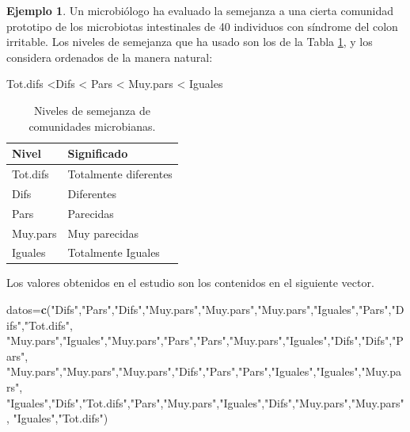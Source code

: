 \documentclass[
]{book}
\newenvironment{Shaded}{\begin{snugshade}}{\end{snugshade}}
\newcommand{\KeywordTok}[1]{\textcolor[rgb]{0.13,0.29,0.53}{\textbf{#1}}}
\newcommand{\NormalTok}[1]{#1}
\newcommand{\StringTok}[1]{\textcolor[rgb]{0.31,0.60,0.02}{#1}}
\theoremstyle{definition}
\theoremstyle{definition}
\newtheorem{example}{Ejemplo}[chapter]
\theoremstyle{definition}
\theoremstyle{remark}
\begin{document}
\begin{example}
\protect\hypertarget{exm:ex1706}{}{\label{exm:ex1706} }Un microbiólogo ha evaluado la semejanza a una cierta comunidad prototipo de los microbiotas intestinales de 40 individuos con síndrome del colon irritable. Los niveles de semejanza que ha usado son los de la Tabla \ref{tab:tablameta}, y los considera ordenados de la manera natural:
\end{example}

Tot.difs \textless Difs \textless{} Pars \textless{} Muy.pars \textless{} Iguales

\begin{table}

\caption{\label{tab:tablameta}Niveles de semejanza de comunidades microbianas.}
\centering
\begin{tabular}[t]{ll}
\toprule
Nivel & Significado\\
\midrule
Tot.difs & Totalmente diferentes\\
Difs & Diferentes\\
Pars & Parecidas\\
Muy.pars & Muy parecidas\\
Iguales & Totalmente Iguales\\
\bottomrule
\end{tabular}
\end{table}

Los valores obtenidos en el estudio son los contenidos en el siguiente vector.

\begin{Shaded}
\begin{Highlighting}[]
\NormalTok{datos=}\KeywordTok{c}\NormalTok{(}\StringTok{"Difs"}\NormalTok{,}\StringTok{"Pars"}\NormalTok{,}\StringTok{"Difs"}\NormalTok{,}\StringTok{"Muy.pars"}\NormalTok{,}\StringTok{"Muy.pars"}\NormalTok{,}\StringTok{"Muy.pars"}\NormalTok{,}\StringTok{"Iguales"}\NormalTok{,}\StringTok{"Pars"}\NormalTok{,}\StringTok{"Difs"}\NormalTok{,}\StringTok{"Tot.difs"}\NormalTok{,}
        \StringTok{"Muy.pars"}\NormalTok{,}\StringTok{"Iguales"}\NormalTok{,}\StringTok{"Muy.pars"}\NormalTok{,}\StringTok{"Pars"}\NormalTok{,}\StringTok{"Pars"}\NormalTok{,}\StringTok{"Muy.pars"}\NormalTok{,}\StringTok{"Iguales"}\NormalTok{,}\StringTok{"Difs"}\NormalTok{,}\StringTok{"Difs"}\NormalTok{,}\StringTok{"Pars"}\NormalTok{,}
        \StringTok{"Muy.pars"}\NormalTok{,}\StringTok{"Muy.pars"}\NormalTok{,}\StringTok{"Muy.pars"}\NormalTok{,}\StringTok{"Difs"}\NormalTok{,}\StringTok{"Pars"}\NormalTok{,}\StringTok{"Pars"}\NormalTok{,}\StringTok{"Iguales"}\NormalTok{,}\StringTok{"Iguales"}\NormalTok{,}\StringTok{"Muy.pars"}\NormalTok{,}
        \StringTok{"Iguales"}\NormalTok{,}\StringTok{"Difs"}\NormalTok{,}\StringTok{"Tot.difs"}\NormalTok{,}\StringTok{"Pars"}\NormalTok{,}\StringTok{"Muy.pars"}\NormalTok{,}\StringTok{"Iguales"}\NormalTok{,}\StringTok{"Difs"}\NormalTok{,}\StringTok{"Muy.pars"}\NormalTok{,}\StringTok{"Muy.pars"}\NormalTok{,}
        \StringTok{"Iguales"}\NormalTok{,}\StringTok{"Tot.difs"}\NormalTok{)}
\end{Highlighting}
\end{Shaded}
\end{document}
